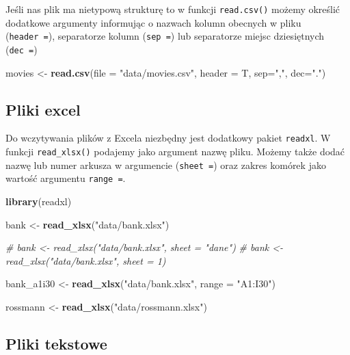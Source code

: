 \documentclass[]{book}
\newenvironment{Shaded}{\begin{snugshade}}{\end{snugshade}}
\newcommand{\KeywordTok}[1]{\textcolor[rgb]{0.13,0.29,0.53}{\textbf{#1}}}
\newcommand{\DataTypeTok}[1]{\textcolor[rgb]{0.13,0.29,0.53}{#1}}
\newcommand{\StringTok}[1]{\textcolor[rgb]{0.31,0.60,0.02}{#1}}
\newcommand{\CommentTok}[1]{\textcolor[rgb]{0.56,0.35,0.01}{\textit{#1}}}
\newcommand{\NormalTok}[1]{#1}
\begin{document}
Jeśli nas plik ma nietypową strukturę to w funkcji \texttt{read.csv()}
możemy określić dodatkowe argumenty informując o nazwach kolumn obecnych
w pliku (\texttt{header\ =}), separatorze kolumn (\texttt{sep\ =}) lub
separatorze miejsc dziesiętnych (\texttt{dec\ =})

\begin{Shaded}
\begin{Highlighting}[]
\NormalTok{movies <-}\StringTok{ }\KeywordTok{read.csv}\NormalTok{(}\DataTypeTok{file =} \StringTok{"data/movies.csv"}\NormalTok{, }\DataTypeTok{header =}\NormalTok{ T, }\DataTypeTok{sep=}\StringTok{","}\NormalTok{, }\DataTypeTok{dec=}\StringTok{"."}\NormalTok{)}
\end{Highlighting}
\end{Shaded}

\subsection{Pliki excel}\label{pliki-excel}

Do wczytywania plików z Excela niezbędny jest dodatkowy pakiet
\texttt{readxl}. W funkcji \texttt{read\_xlsx()} podajemy jako argument
nazwę pliku. Możemy także dodać nazwę lub numer arkusza w argumencie
(\texttt{sheet\ =}) oraz zakres komórek jako wartość argumentu
\texttt{range\ =}.

\begin{Shaded}
\begin{Highlighting}[]
\KeywordTok{library}\NormalTok{(readxl)}

\NormalTok{bank <-}\StringTok{ }\KeywordTok{read_xlsx}\NormalTok{(}\StringTok{"data/bank.xlsx"}\NormalTok{)}

\CommentTok{# bank <- read_xlsx("data/bank.xlsx", sheet = "dane")}
\CommentTok{# bank <- read_xlsx("data/bank.xlsx", sheet = 1)}

\NormalTok{bank_a1i30 <-}\StringTok{ }\KeywordTok{read_xlsx}\NormalTok{(}\StringTok{"data/bank.xlsx"}\NormalTok{, }\DataTypeTok{range =} \StringTok{"A1:I30"}\NormalTok{)}

\NormalTok{rossmann <-}\StringTok{ }\KeywordTok{read_xlsx}\NormalTok{(}\StringTok{"data/rossmann.xlsx"}\NormalTok{)}
\end{Highlighting}
\end{Shaded}

\subsection{Pliki tekstowe}\label{pliki-tekstowe}
\end{document}
